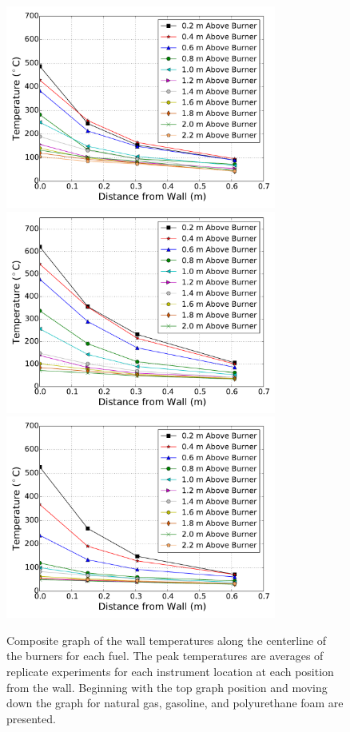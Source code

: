 \documentclass[twoside]{uocthesis}
\begin{document}
{\begin{figure}[p]
	\centering
	\includegraphics[width=3.5in]{../Figures/NCTW_NG_TC_Surface_Center_Avg}\\
	\includegraphics[width=3.5in]{../Figures/NCTW_GAS_TC_Surface_Center_Avg}\\
	\includegraphics[width=3.5in]{../Figures/NCTW_PUF_TC_Surface_Center_Avg}\\
	\caption[Composite graph of the wall temperatures along the centerline of the burners]{Composite graph of the wall temperatures along the centerline of the burners for each fuel. The peak temperatures are averages of replicate experiments for each instrument location at each position from the wall. Beginning with the top graph position and moving down the graph for natural gas, gasoline, and polyurethane foam are presented.}
	\label{NCTW_Surf_Center_comp}
\end{figure}

}
\end{document}
